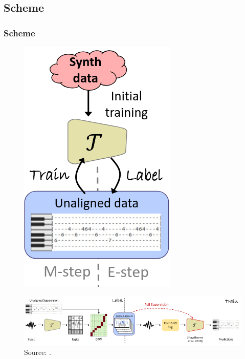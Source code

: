 \documentclass{beamer}
\begin{document}
\subsection{Scheme}
\begin{frame}
	\frametitle{Scheme}

	\begin{figure}[!ht]
		\centering
		\includegraphics[width=.2\textwidth]{AMT-general.png}
	\end{figure}

	\begin{figure}[!ht]
		\centering
		\includegraphics[width=.9\textwidth]{AMT-scheme.png}
		\caption{Source: \cite{AMT}.}
		\label{fig:AMT-scheme}
	\end{figure}

\end{frame}
\end{document}
